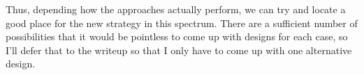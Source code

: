 \documentclass{article}
\begin{document}
Thus, depending how the approaches actually perform, we can try and locate a good place for the new strategy in this spectrum. There are a sufficient number of possibilities that it would be pointless to come up with designs for each case, so I'll defer that to the writeup so that I only have to come up with one alternative design.
\end{document}
